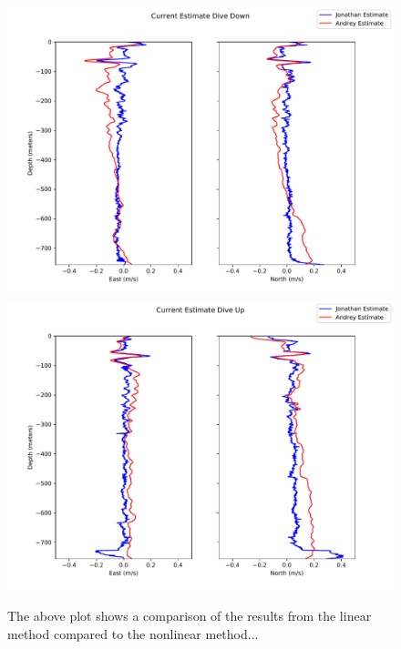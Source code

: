 \begin{figure}
  \includegraphics[width=\columnwidth]{./figs/downfull.pdf}
  \includegraphics[width=\columnwidth]{./figs/upfull.pdf}
  \caption{The above plot shows a comparison of the results from the linear method compared to the nonlinear method...}
  \label{fig.comparison}
\end{figure}


